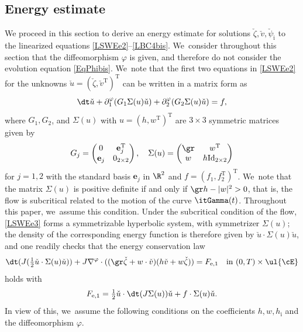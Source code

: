 \subsection{Energy estimate}
We proceed in this section to derive an energy estimate for solutions $\check{\zeta},\check{v},\check{\psi}_\mathrm{i}$ to the linearized equations
\eqref{LSWEe2}--\eqref{LBC4bis}. We~consider throughout this section that the diffeomorphism $\varphi$ is given, and therefore do not consider the evolution equation \eqref{EqPhibis}. We~note that the first two equations in \eqref{LSWEe2} for the unknowns $\check{u}=(\check{\zeta},\check{v}^\mathrm{T})^\mathrm{T}$
can be written in a matrix form as
\begin{equation}\label{LSWEe3}
\dt\check{u}+\partial_1^\varphi(G_1\Sigma(u)\check{u})+\partial_2^\varphi(G_2\Sigma(u)\check{u})=f,
\end{equation}
where $G_1,G_2$, and $\Sigma(u)$ with $u=(h,w^\mathrm{T})^\mathrm{T}$ are $3\times3$ symmetric matrices given by
\[
G_j=
\begin{pmatrix}
0 & \mathbf{e}_j^\mathrm{T} \\
\mathbf{e}_j & 0_{2\times2}
\end{pmatrix}, \quad
\Sigma(u)=
\begin{pmatrix}
\gr & w^\mathrm{T} \\
w & h\mathrm{Id}_{2\times2}
\end{pmatrix}
\]
for $j=1,2$ with the standard basis $\mathbf{e}_j$ in $\R^2$ and $f=(f_1,f_2^\mathrm{T})^\mathrm{T}$. We~note that the matrix $\Sigma(u)$ is positive definite if and only if $\gr h-|w|^2>0$, that is,
the flow is subcritical related to the motion of the curve $\itGamma(t)$.
Throughout this paper, we~assume this condition.
Under the subcritical condition of the flow, \eqref{LSWEe3} forms a symmetrizable hyperbolic system, with symmetrizer $\Sigma(u)$;
the density of the corresponding energy function is therefore given by $\check{u}\cdot\Sigma(u)\check{u}$,
and one readily checks that the energy conservation law
\begin{equation}\label{localCE}
\dt(J(\tfrac12\check{u}\cdot\Sigma(u)\check{u}))
+ J\nabla^\varphi\cdot((\gr\check{\zeta}+w\cdot\check{v})(h\check{v}+w\check{\zeta})) = F_\mathrm{e,1}
\quad\text{in } (0,T)\times\ul{\cE}
\end{equation}
holds with
\[
F_\mathrm{e,1}=\tfrac{1}{2}\check{u}\cdot\dt (J\Sigma(u))\check{u} + f\cdot \Sigma(u)\check{u}.
\]
In view of this, we~assume the following conditions on the coefficients $h,w,h_\mathrm{i}$ and the diffeomorphism $\varphi$.
